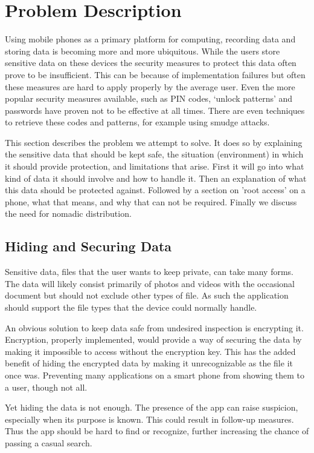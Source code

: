 \section{Problem Description}
\label{sec:problem-description}
Using mobile phones as a primary platform for computing, recording data and storing data is becoming more and more ubiquitous.
While the users store sensitive data on these devices the security measures to protect this data often prove to be insufficient.
This can be because of implementation failures but often these measures are hard to apply properly by the average user\cite{usablesecurity,cannotsecurity}.
Even the more popular security measures available, such as PIN codes, `unlock patterns' and passwords have proven not to be effective at all times.
There are even techniques to retrieve these codes and patterns, for example using smudge attacks\cite{aviv2010smudge}.

This section describes the problem we attempt to solve.
It does so by explaining the sensitive data that should be kept safe, the situation (environment) in which it should provide protection, and limitations that arise. 
First it will go into what kind of data it should involve and how to handle it. 
Then an explanation of what this data should be protected against. 
Followed by a section on 'root access' on a phone, what that means, and why that can not be required.
Finally we discuss the need for nomadic distribution.

\subsection{Hiding and Securing Data}
Sensitive data, files that the user wants to keep private, can take many forms.
The data will likely consist primarily of photos and videos with the occasional document but should not exclude other types of file.
As such the application should support the file types that the device could normally handle.

An obvious solution to keep data safe from undesired inspection is encrypting it.
Encryption, properly implemented, would provide a way of securing the data by making it impossible to access without the encryption key. 
This has the added benefit of hiding the encrypted data by making it unrecognizable as the file it once was.
Preventing many applications on a smart phone from showing them to a user, though not all.

Yet hiding the data is not enough.
The presence of the app can raise suspicion, especially when its purpose is known. 
This could result in follow-up measures.
Thus the app should be hard to find or recognize, further increasing the chance of passing a casual search.

